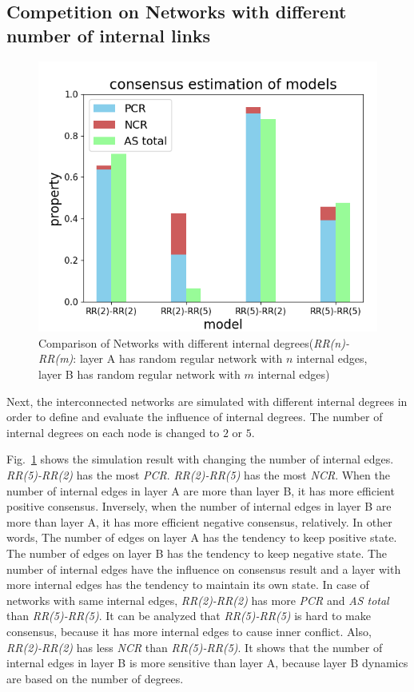 \documentclass[english]{cccconf}
\begin{document}
\subsection{Competition on Networks with different number of internal links}
\begin{figure}[!htb]
	\centering
	\includegraphics[width=\hsize]{FIG6.png}
	\caption{Comparison of Networks with different internal degrees(\textit{RR(n)-RR(m)}: layer A has random regular network with $n$ internal edges, layer B has random regular network with $m$ internal edges)}
	\label{Fig6}
\end{figure}
Next, the interconnected networks are simulated with different internal degrees in order to define and evaluate the influence of internal degrees. The number of internal degrees on each node is changed to $2$ or $5$.

Fig.~\ref{Fig6} shows the simulation result with changing the number of internal edges. \textit{RR(5)-RR(2)} has the most \textit{PCR}. \textit{RR(2)-RR(5)} has the most \textit{NCR}. When the number of internal edges in layer A are more than layer B, it has more efficient positive consensus. Inversely, when the number of internal edges in layer B are more than layer A, it has more efficient negative consensus, relatively. In other words, The number of edges on layer A has the tendency to keep positive state. The number of edges on layer B has the tendency to keep negative state. The number of internal edges have the influence on consensus result and a layer with more internal edges has the tendency to maintain its own state. In case of networks with same internal edges, \textit{RR(2)-RR(2)} has more \textit{PCR} and \textit{AS total} than \textit{RR(5)-RR(5)}. It can be analyzed that \textit{RR(5)-RR(5)} is hard to make consensus, because it has more internal edges to cause inner conflict. Also, \textit{RR(2)-RR(2)} has less \textit{NCR} than \textit{RR(5)-RR(5)}. It shows that the number of internal edges in layer B is more sensitive than layer A, because layer B dynamics are based on the number of degrees.   
\end{document}
